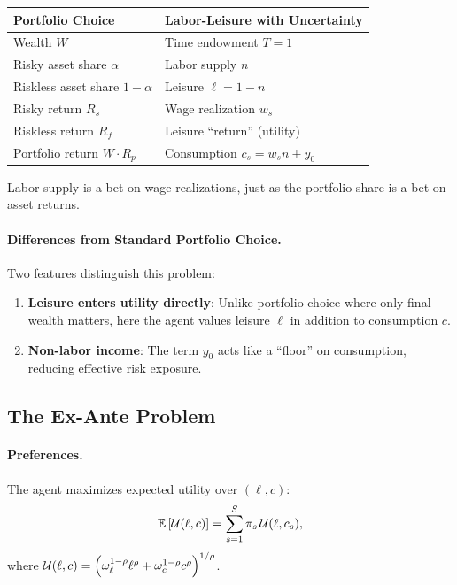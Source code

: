 \begin{calloutimportant}
\begin{center}
\renewcommand{\arraystretch}{1.4}
\begin{tabular}{@{}ll@{}}
\toprule
\textbf{Portfolio Choice} & \textbf{Labor-Leisure with Uncertainty} \\
\midrule
Wealth $W$ & Time endowment $T = 1$ \\
Risky asset share $\alpha$ & Labor supply $n$ \\
Riskless asset share $1 - \alpha$ & Leisure $\ell = 1 - n$ \\
Risky return $R_s$ & Wage realization $w_s$ \\
Riskless return $R_f$ & Leisure ``return'' (utility) \\
Portfolio return $W \cdot R_p$ & Consumption $c_s = w_s n + y_0$ \\
\bottomrule
\end{tabular}
\end{center}
Labor supply is a bet on wage realizations, just as the portfolio share is a bet on asset returns.
\end{calloutimportant}

\paragraph{Differences from Standard Portfolio Choice.}
Two features distinguish this problem:
\begin{enumerate}[leftmargin=2em]
\item \textbf{Leisure enters utility directly}: Unlike portfolio choice where only final wealth matters, here the agent values leisure $\ell$ in addition to consumption $c$.
\item \textbf{Non-labor income}: The term $y_0$ acts like a ``floor'' on consumption, reducing effective risk exposure.
\end{enumerate}

\subsection{The Ex-Ante Problem}
\label{subsec:ex-ante}

\paragraph{Preferences.}
The agent maximizes expected utility over $(\ell, c)$:
\begin{equation}
\mathbb{E}\left[ \mathcal{U}(\ell, c) \right] = \sum_{s=1}^{S} \pi_s \, \mathcal{U}(\ell, c_s),
\label{eq:expected-utility}
\end{equation}
where $\mathcal{U}(\ell, c) = \left( \omega_\ell^{1-\rho} \ell^\rho + \omega_c^{1-\rho} c^\rho \right)^{1/\rho}$.

